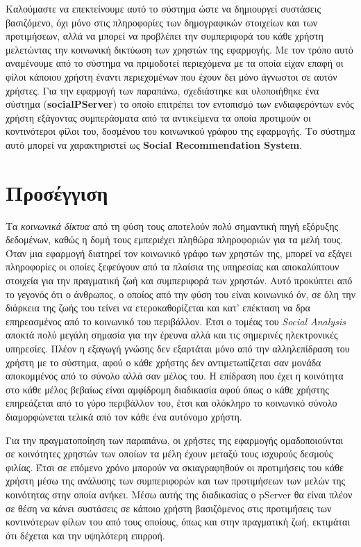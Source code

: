 Καλούμαστε να επεκτείνουμε αυτό το σύστημα ώστε να δημιουργεί συστάσεις βασιζόμενο, όχι μόνο στις πληροφορίες των δημογραφικών στοιχείων και των προτιμήσεων, 
αλλά να μπορεί να προβλέπει την συμπεριφορά του κάθε χρήστη μελετώντας την κοινωνική δικτύωση των χρηστών της εφαρμογής. 
Με τον τρόπο αυτό αναμένουμε από το σύστημα να πριμοδοτεί περιεχόμενα με τα οποία είχαν
επαφή οι φίλοι κάποιου χρήστη έναντι περιεχομένων που έχουν δει μόνο άγνωστοι σε αυτόν χρήστες.
Για την εφαρμογή των παραπάνω, σχεδιάστηκε και υλοποιήθηκε ένα σύστημα (\textbf{socialPServer}) το οποίο επιτρέπει τον εντοπισμό των ενδιαφερόντων ενός 
χρήστη εξάγοντας συμπεράσματα από τα αντικείμενα 
τα οποία προτιμούν οι κοντινότεροι φίλοι του,
δοσμένου του κοινωνικού γράφου της εφαρμογής. 
Το σύστημα αυτό μπορεί να χαρακτηριστεί ως \textbf{Social Recommendation System}.

\section{Προσέγγιση}
\noindent
Τα \emph{κοινωνικά δίκτυα} από τη φύση τους αποτελούν πολύ σημαντική πηγή εξόρυξης δεδομένων, καθώς η δομή τους εμπεριέχει πληθώρα πληροφοριών για τα μελή τους.
Όταν μια εφαρμογή διατηρεί τον κοινωνικό γράφο των χρηστών της, μπορεί να εξάγει πληροφορίες οι οποίες ξεφεύγουν 
από τα πλαίσια της υπηρεσίας και αποκαλύπτουν στοιχεία για την πραγματική ζωή και συμπεριφορά των χρηστών. 
Αυτό προκύπτει από το γεγονός ότι ο άνθρωπος, ο οποίος από την φύση του είναι κοινωνικό όν, σε όλη την διάρκεια 
της ζωής του τείνει να ετεροκαθορίζεται και κατ' επέκταση να δρα επηρεασμένος από το κοινωνικό του περιβάλλον.
Έτσι ο τομέας του \emph{Social Analysis} αποκτά πολύ μεγάλη σημασία για την έρευνα αλλά και τις σημερινές ηλεκτρονικές υπηρεσίες.
Πλέον η εξαγωγή γνώσης δεν εξαρτάται μόνο από την αλληλεπίδραση του χρήστη με το σύστημα, αφού ο κάθε χρήστης δεν αντιμετωπίζεται σαν μονάδα αποκομμένος από το σύνολο 
αλλά σαν μέλος του. 
Η επίδραση που έχει η κοινότητα στο κάθε μέλος βεβαίως είναι αμφίδρομη διαδικασία αφού όπως ο κάθε χρήστης επηρεάζεται από το γύρο περιβάλλον του, έτσι και ολόκληρο το
κοινωνικό σύνολο διαμορφώνεται τελικά από τον κάθε ένα αυτόνομο χρήστη.

Για την πραγματοποίηση των παραπάνω, οι χρήστες της εφαρμογής ομαδοποιούνται σε κοινότητες χρηστών των οποίων τα μέλη έχουν μεταξύ τους ισχυρούς δεσμούς φιλίας. 
Έτσι σε επόμενο χρόνο μπορούν να σκιαγραφηθούν οι προτιμήσεις του κάθε χρήστη μέσω της ανάλυσης των συμπεριφορών και των προτιμήσεων των μελών της κοινότητας στην οποία ανήκει. 
Μέσω αυτής της διαδικασίας ο pServer θα είναι πλέον σε θέση να κάνει συστάσεις σε κάποιο χρήστη βασιζόμενος στις προτιμήσεις των κοντινότερων φίλων του
από τους οποίους, όπως και στην πραγματική ζωή, εκτιμάται ότι δέχεται και την υψηλότερη επιρροή.

